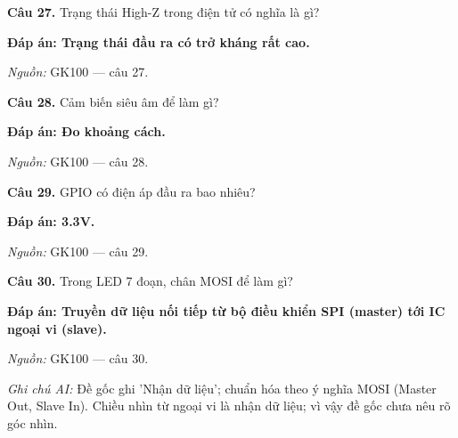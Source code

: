 \documentclass[11pt,a4paper]{article}
\begin{document}
\textbf{Câu 27.} Trạng thái High-Z trong điện tử có nghĩa là gì?\par
{\color{answer}\textbf{Đáp án: Trạng thái đầu ra có trở kháng rất cao.}}\par
{\footnotesize\color{sourcegray}\textit{Nguồn:} GK100 — câu 27.\par}
\vspace{3pt}\par\noindent{\color{black!18}\rule{\linewidth}{0.3pt}}\par\medskip

\textbf{Câu 28.} Cảm biến siêu âm để làm gì?\par
{\color{answer}\textbf{Đáp án: Đo khoảng cách.}}\par
{\footnotesize\color{sourcegray}\textit{Nguồn:} GK100 — câu 28.\par}
\vspace{3pt}\par\noindent{\color{black!18}\rule{\linewidth}{0.3pt}}\par\medskip

\textbf{Câu 29.} GPIO có điện áp đầu ra bao nhiêu?\par
{\color{answer}\textbf{Đáp án: 3.3V.}}\par
{\footnotesize\color{sourcegray}\textit{Nguồn:} GK100 — câu 29.\par}
\vspace{3pt}\par\noindent{\color{black!18}\rule{\linewidth}{0.3pt}}\par\medskip

\textbf{Câu 30.} Trong LED 7 đoạn, chân MOSI để làm gì?\par
{\color{answer}\textbf{Đáp án: Truyền dữ liệu nối tiếp từ bộ điều khiển SPI (master) tới IC ngoại vi (slave).}}\par
{\footnotesize\color{sourcegray}\textit{Nguồn:} GK100 — câu 30.\par}
{\footnotesize\color{sourcegray}\textit{Ghi chú AI:} Đề gốc ghi 'Nhận dữ liệu'; chuẩn hóa theo ý nghĩa MOSI (Master Out, Slave In). Chiều nhìn từ ngoại vi là nhận dữ liệu; vì vậy đề gốc chưa nêu rõ góc nhìn.\par}
\vspace{3pt}\par\noindent{\color{black!18}\rule{\linewidth}{0.3pt}}\par\medskip
\end{document}
